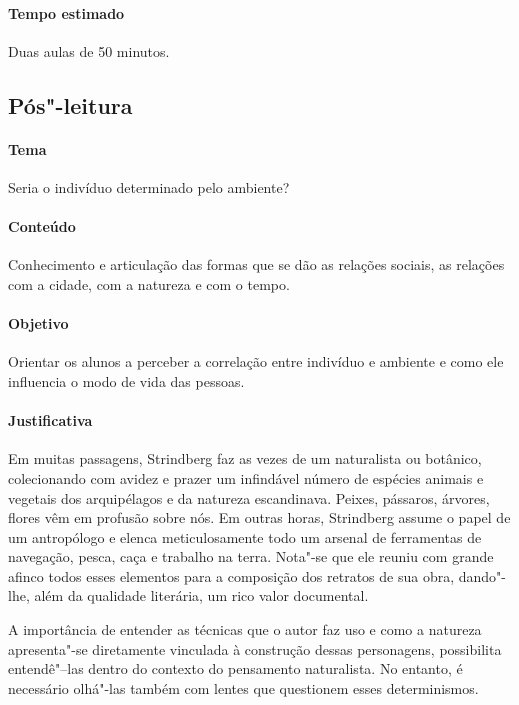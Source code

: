 \documentclass[12pt]{extarticle}
\begin{document}
\paragraph{Tempo estimado} Duas aulas de 50 minutos.

\subsection{Pós"-leitura}

\paragraph{Tema} Seria o indivíduo determinado pelo ambiente? 

\paragraph{Conteúdo} Conhecimento e articulação das formas que se dão as 
relações sociais, as relações com a cidade, com a natureza e com o tempo.

\paragraph{Objetivo} Orientar os alunos a perceber a 
correlação entre indivíduo e ambiente e como ele influencia o modo de vida 
das pessoas.

\paragraph{Justificativa} Em muitas passagens, Strindberg
faz as vezes de um naturalista ou botânico, colecionando
com avidez e prazer um infindável número de espécies
animais e vegetais dos arquipélagos e da natureza escandinava.
Peixes, pássaros, árvores, flores vêm em profusão
sobre nós. Em outras horas, Strindberg assume o papel
de um antropólogo e elenca meticulosamente todo um arsenal
de ferramentas de navegação, pesca, caça e trabalho na
terra. Nota"-se que ele reuniu com grande afinco todos esses
elementos para a composição dos retratos de sua obra, dando"-lhe,
além da qualidade literária, um rico valor documental.

A importância de entender as técnicas que o autor faz uso e como a natureza 
apresenta"-se diretamente vinculada à construção dessas personagens, 
possibilita entendê"--las dentro do contexto do pensamento naturalista. 
No entanto, é necessário olhá"-las também com lentes que questionem esses determinismos.
\end{document}
